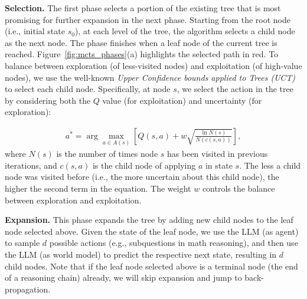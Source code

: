 \noindent \textbf{Selection.}
The first phase selects a portion of the existing tree that is most promising for further expansion in the next phase. Starting from the root node (i.e., initial state $s_0$), at each level of the tree, the algorithm selects a child node as the next node. The phase finishes when a leaf node of the current tree is reached. Figure~\ref{fig:mcts_phases}(a) highlights the selected path in red. To balance between exploration (of less-visited nodes) and exploitation (of high-value nodes), we use the well-known \emph{Upper Confidence bounds applied to Trees (UCT)} \cite{kocsis2006bandit} to select each child node. Specifically, at node $s$, we select the action in the tree by considering both the $Q$ value (for exploitation) and uncertainty (for exploration):

\vspace{-8pt}
{
\small
\begin{align}
    a^\ast = \arg\max_{a \in A(s)} \left[ Q(s, a) + w \sqrt{\frac{\ln N(s)}{N(c(s, a))}} \right],
\end{align}
}
\noindent where $N(s)$ is the number of times node $s$ has been visited in previous iterations, and $c(s, a)$ is the child node of applying $a$ in state $s$. The less a child node was visited before (i.e., the more uncertain about this child node), the higher the second term in the equation. The weight $w$ controls the balance between exploration and exploitation. 


\noindent \textbf{Expansion.} 
This phase expands the tree by adding new child nodes to the leaf node selected above. Given the state of the leaf node, we use the LLM (as agent) to sample $d$ possible actions (e.g., subquestions in math reasoning), and then use the LLM (as world model) to predict the respective next state, resulting in $d$ child nodes. Note that if the leaf node selected above is a terminal node (the end of a reasoning chain) already, we will skip expansion and jump to back-propagation.

